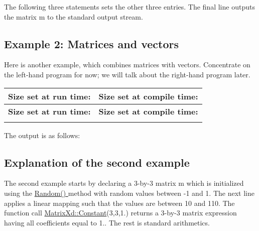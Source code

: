 The following three statements sets the other three entries. The final line outputs the matrix {\ttfamily m} to the standard output stream.\hypertarget{_getting_started_GettingStartedExample2}{}\subsection{Example 2\+: Matrices and vectors}\label{_getting_started_GettingStartedExample2}
Here is another example, which combines matrices with vectors. Concentrate on the left-\/hand program for now; we will talk about the right-\/hand program later.

\tabulinesep=1mm
\begin{longtabu} spread 0pt [c]{*{2}{|X[-1]}|}
\hline
\rowcolor{\tableheadbgcolor}\textbf{ Size set at run time\+:}&\textbf{ Size set at compile time\+: }\\
\endfirsthead
\hline
\endfoot
\hline
\rowcolor{\tableheadbgcolor}\textbf{ Size set at run time\+:}&\textbf{ Size set at compile time\+: }\\
\endhead

\begin{DoxyCodeInclude}
\end{DoxyCodeInclude}
  &
\begin{DoxyCodeInclude}
\end{DoxyCodeInclude}
 \\
\end{longtabu}


The output is as follows\+:


\begin{DoxyCodeInclude}
\end{DoxyCodeInclude}
\hypertarget{_getting_started_GettingStartedExplanation2}{}\subsection{Explanation of the second example}\label{_getting_started_GettingStartedExplanation2}
The second example starts by declaring a 3-\/by-\/3 matrix {\ttfamily m} which is initialized using the \hyperlink{group___core___module_ae97f8d9d08f969c733c8144be6225756}{Random() } method with random values between -\/1 and 1. The next line applies a linear mapping such that the values are between 10 and 110. The function call \hyperlink{group___core___module_ab0ae1bfa72faedcaf53af81ca76c446b}{Matrix\+Xd\+::\+Constant}(3,3,1.) returns a 3-\/by-\/3 matrix expression having all coefficients equal to 1.. The rest is standard arithmetics.

